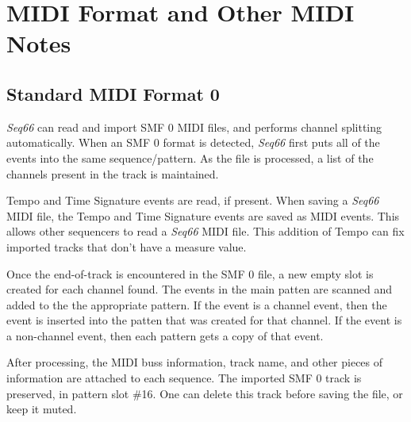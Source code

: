 %
%
%

\section{MIDI Format and Other MIDI Notes}
\label{sec:midi_format_and_midi_notes}

\subsection{Standard MIDI Format 0}
\label{subsec:midi_format_smf_0}

   \textsl{Seq66} can read and import SMF 0 MIDI files, and performs
   channel splitting automatically.
   When an SMF 0 format is detected, \textsl{Seq66} first
   puts all of the events into the same sequence/pattern.
   As the file is processed, a list of the channels present in the
   track is maintained.

   Tempo and Time Signature events are read, if present.
   When saving a \textsl{Seq66} MIDI file,
   the Tempo and Time Signature events are saved as MIDI events.
   This allows other sequencers to read a \textsl{Seq66} MIDI file.
   This addition of Tempo can fix imported tracks that don't have a
   measure value.

   Once the end-of-track is encountered in the SMF 0 file, a new empty
   slot is created for each channel found.
   The events in the main patten are scanned and added to the
   the appropriate pattern.  If the event is a channel event,
   then the event is inserted into the patten that was created for that
   channel.  If the event is a non-channel event, then each pattern gets a
   copy of that event.

   After processing, the MIDI buss information, track name, and other pieces of
   information are attached to each sequence.
   The imported SMF 0 track is preserved, in
   pattern slot \#16.
   One can delete this track before saving the file, or keep it muted.


